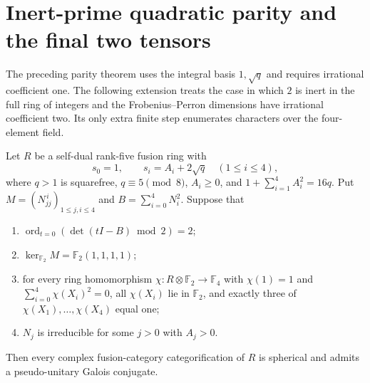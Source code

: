\section{Inert-prime quadratic parity and the final two tensors}
\label{sec:inert-parity}
The preceding parity theorem uses the integral basis $1,\sqrt q$ and
requires irrational coefficient one. The following extension treats the
case in which $2$ is inert in the full ring of integers and the
Frobenius--Perron dimensions have irrational coefficient two. Its only
extra finite step enumerates characters over the four-element field.

\begin{theorem}\label{thm:inert-parity}
Let $R$ be a self-dual rank-five fusion ring with
\[
 s_0=1,\qquad s_i=A_i+2\sqrt q\quad(1\le i\le4),
\]
where $q>1$ is squarefree, $q\equiv5\pmod8$, $A_i\ge0$, and
$1+\sum_{i=1}^4A_i^2=16q$. Put
$M=(N_{jj}^{\,i})_{1\le j,i\le4}$ and
$B=\sum_{i=0}^4 N_i^2$. Suppose that
\begin{enumerate}
\item $\operatorname{ord}_{t=0}(\det(tI-B)\bmod2)=2$;
\item $\ker_{\mathbb F_2}M=\mathbb F_2(1,1,1,1)$;
\item for every ring homomorphism
 $\chi:R\otimes\mathbb F_2\longrightarrow\mathbb F_4$ with
 $\chi(1)=1$ and $\sum_{i=0}^4\chi(X_i)^2=0$, all
 $\chi(X_i)$ lie in $\mathbb F_2$, and exactly three of
 $\chi(X_1),\ldots,\chi(X_4)$ equal one;
\item $N_j$ is irreducible for some $j>0$ with $A_j>0$.
\end{enumerate}
Then every complex fusion-category categorification of $R$ is
spherical and admits a pseudo-unitary Galois conjugate.
\end{theorem}
